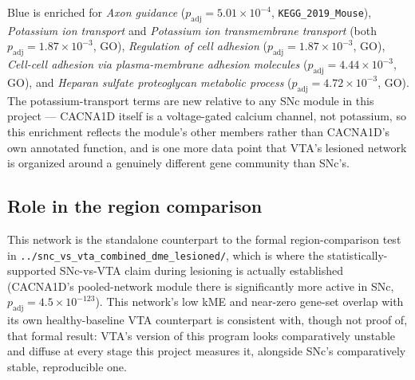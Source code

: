 \documentclass[11pt]{article}
\begin{document}
Blue is enriched for \emph{Axon guidance} ($p_{\mathrm{adj}}=5.01\times10^{-4}$,
\texttt{KEGG\_2019\_Mouse}), \emph{Potassium ion transport} and
\emph{Potassium ion transmembrane transport} (both
$p_{\mathrm{adj}}=1.87\times10^{-3}$, GO), \emph{Regulation of cell
adhesion} ($p_{\mathrm{adj}}=1.87\times10^{-3}$, GO), \emph{Cell-cell
adhesion via plasma-membrane adhesion molecules}
($p_{\mathrm{adj}}=4.44\times10^{-3}$, GO), and \emph{Heparan sulfate
proteoglycan metabolic process} ($p_{\mathrm{adj}}=4.72\times10^{-3}$, GO).
The potassium-transport terms are new relative to any SNc module in this
project --- CACNA1D itself is a voltage-gated calcium channel, not
potassium, so this enrichment reflects the module's other members rather
than CACNA1D's own annotated function, and is one more data point that
VTA's lesioned network is organized around a genuinely different gene
community than SNc's.

\subsection*{Role in the region comparison}

This network is the standalone counterpart to the formal region-comparison
test in \texttt{../snc\_vs\_vta\_combined\_dme\_lesioned/}, which is where
the statistically-supported SNc-vs-VTA claim during lesioning is actually
established (CACNA1D's pooled-network module there is significantly more
active in SNc, $p_{\mathrm{adj}}=4.5\times10^{-123}$). This network's low
kME and near-zero gene-set overlap with its own healthy-baseline VTA
counterpart is consistent with, though not proof of, that formal result:
VTA's version of this program looks comparatively unstable and diffuse at
every stage this project measures it, alongside SNc's comparatively stable,
reproducible one.
\end{document}
